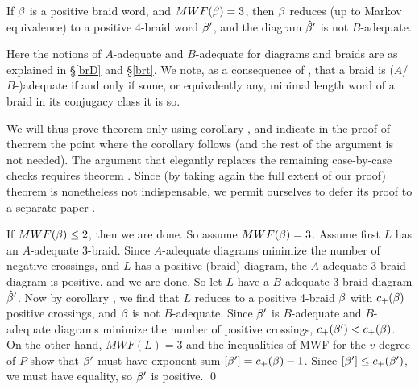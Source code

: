 \begin{corr}\label{cort}
If $\beta$ is a positive braid word, and $MWF(\beta)=3$, then $\beta$
reduces (up to Markov equivalence) to a positive 4-braid word $\beta'$,
and the diagram $\hat{\beta}'$ is not $B$-adequate.
\end{corr}

Here the notions of $A$-adequate and $B$-adequate for diagrams
and braids are as explained in \S\ref{brD} and \S\ref{brt}. We
note, as a consequence of \cite{Thistle}, that a braid is ($A$/%
$B$-)adequate if and only if some, or equivalently any,
minimal length word of a braid in its conjugacy class it is so.

We will thus prove theorem  only using corollary
, and indicate in the proof of theorem 
the point where the corollary follows (and the rest of the argument
is not needed). The argument that elegantly replaces the remaining
case-by-case checks requires theorem . Since (by
taking again the full extent of our proof) theorem 
is nonetheless not indispensable, we permit ourselves to defer its
proof to a separate paper \cite{ntriv}.


% 
% 

If $MWF(\beta)\le 2$, then we are done. So assume $MWF(\beta)=3$.
Assume first $L$ has an $A$-adequate 3-braid. Since $A$-adequate
diagrams minimize the number of negative crossings, and $L$ has
a positive (braid) diagram, the $A$-adequate 3-braid diagram is
positive, and we are done. So let $L$ have a $B$-adequate 3-braid
diagram $\hat{\beta}'$. Now by corollary , we find
that $L$ reduces to a positive 4-braid $\beta$
with $c_+(\beta)$ positive crossings, and $\beta$ is not $B$-adequate.
Since $\beta'$ is $B$-adequate and $B$-adequate diagrams
minimize the number of positive crossings, $c_+(\beta')<c_+(\beta)$.
On the other hand, $MWF(L)=3$ and the inequalities of MWF for the
$v$-degree of $P$ show that $\beta'$ must have exponent sum
$[\beta']=c_+(\beta)-1$. Since $[\beta']\le c_+(\beta')$, we must have
equality, so $\beta'$ is positive. \qed

